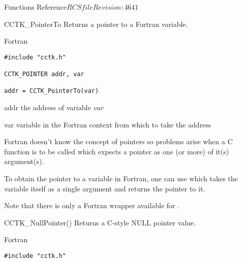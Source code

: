 \begin{cactuspart}{ Functions Reference}{$RCSfile$}{$Revision: 4641 $}
\begin{FunctionDescription}{CCTK\_PointerTo}%
\label{CCTK-PointerTo}
Returns a pointer to a Fortran variable.

\begin{SynopsisSection}
\begin{Synopsis}{Fortran}
\begin{verbatim}
#include "cctk.h"

CCTK_POINTER addr, var

addr = CCTK_PointerTo(var)
\end{verbatim}
\end{Synopsis}
\end{SynopsisSection}

\begin{ResultSection}
\begin{Result}{addr}
the address of variable {\it var}
\end{Result}
\end{ResultSection}

\begin{ParameterSection}
\begin{Parameter}{var}
variable in the Fortran context from which to take the address
\end{Parameter}
\end{ParameterSection}

\begin{Discussion}
Fortran doesn't know the concept of pointers so problems arise when a C function
is to be called which expects a pointer as one (or more) of it(s) argument(s).

To obtain the pointer to a variable in Fortran, one can use  which takes the variable itself as a single argument and returns the
pointer to it.

Note that there is only a Fortran wrapper available for .
\end{Discussion}

\begin{SeeAlsoSection}
\begin{SeeAlso}{CCTK\_NullPointer()}
Returns a C-style NULL pointer value.
\end{SeeAlso}
\end{SeeAlsoSection}

\begin{ExampleSection}
\begin{Example}{Fortran}
\begin{verbatim}
#include "cctk.h"


\end{verbatim}
\end{Example}
\end{ExampleSection}
\end{FunctionDescription}
\end{cactuspart}
